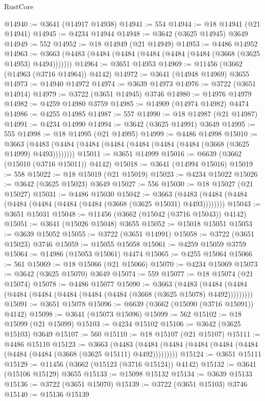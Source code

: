 \begin{lexlean}{RustCore}
\begin{coremodule}
@14940 := @3641 (@14917 @14938)
@14941 := 554
@14944 := @18 @14941 (@21 @14941)
@14945 := @4234 @14944
@14948 := @3642 (@3625 @14945) @3649
@14949 := 552
@14952 := @18 @14949 (@21 @14949)
@14953 := @4486 @14952
@14963 := @3663 (@4483 (@4484 (@4484 (@4484 (@4484 (@4484 (@3668 (@3625 @14953) @4494)))))))
@14964 := @3651 @14953
@14969 := @11456 (@3662 (@14963 (@3716 @14964)) @4142)
@14972 := @3641 (@14948 @14969) @3655
@14973 := @14940 @14972
@14974 := @3639 @14973
@14976 := @3722 (@3651 @14914)
@14979 := @3722 (@3651 @14945) @3746
@14980 := @14976 @14979
@14982 := @4259 @14980 @3759
@14985 := @14909 (@14974 @14982) @4474
@14986 := @4255 @14985
@14987 := 557
@14990 := @18 @14987 (@21 @14987)
@14991 := @4234 @14990
@14994 := @3642 (@3625 @14991) @3649
@14995 := 555
@14998 := @18 @14995 (@21 @14995)
@14999 := @4486 @14998
@15010 := @3663 (@4483 (@4484 (@4484 (@4484 (@4484 (@4484 (@4484 (@3668 (@3625 @14999) @4493))))))))
@15011 := @3651 @14999
@15016 := @6639 (@3662 (@15010 (@3716 @15011)) @4142)
@15018 := @3641 (@14994 @15016)
@15019 := 558
@15022 := @18 @15019 (@21 @15019)
@15023 := @4234 @15022
@15026 := @3642 (@3625 @15023) @3649
@15027 := 556
@15030 := @18 @15027 (@21 @15027)
@15031 := @4486 @15030
@15042 := @3663 (@4483 (@4484 (@4484 (@4484 (@4484 (@4484 (@4484 (@3668 (@3625 @15031) @4493))))))))
@15043 := @3651 @15031
@15048 := @11456 (@3662 (@15042 (@3716 @15043)) @4142)
@15051 := @3641 (@15026 @15048) @3655
@15052 := @15018 @15051
@15053 := @3639 @15052
@15055 := @3722 (@3651 @14991)
@15058 := @3722 (@3651 @15023) @3746
@15059 := @15055 @15058
@15061 := @4259 @15059 @3759
@15064 := @14986 (@15053 @15061) @4474
@15065 := @4255 @15064
@15066 := 561
@15069 := @18 @15066 (@21 @15066)
@15070 := @4234 @15069
@15073 := @3642 (@3625 @15070) @3649
@15074 := 559
@15077 := @18 @15074 (@21 @15074)
@15078 := @4486 @15077
@15090 := @3663
    (@4483 (@4484 (@4484 (@4484 (@4484 (@4484 (@4484 (@4484 (@3668 (@3625 @15078) @4492)))))))))
@15091 := @3651 @15078
@15096 := @6639 (@3662 (@15090 (@3716 @15091)) @4142)
@15098 := @3641 (@15073 @15096)
@15099 := 562
@15102 := @18 @15099 (@21 @15099)
@15103 := @4234 @15102
@15106 := @3642 (@3625 @15103) @3649
@15107 := 560
@15110 := @18 @15107 (@21 @15107)
@15111 := @4486 @15110
@15123 := @3663
    (@4483 (@4484 (@4484 (@4484 (@4484 (@4484 (@4484 (@4484 (@3668 (@3625 @15111) @4492)))))))))
@15124 := @3651 @15111
@15129 := @11456 (@3662 (@15123 (@3716 @15124)) @4142)
@15132 := @3641 (@15106 @15129) @3655
@15133 := @15098 @15132
@15134 := @3639 @15133
@15136 := @3722 (@3651 @15070)
@15139 := @3722 (@3651 @15103) @3746
@15140 := @15136 @15139

\end{coremodule}
\end{lexlean}
